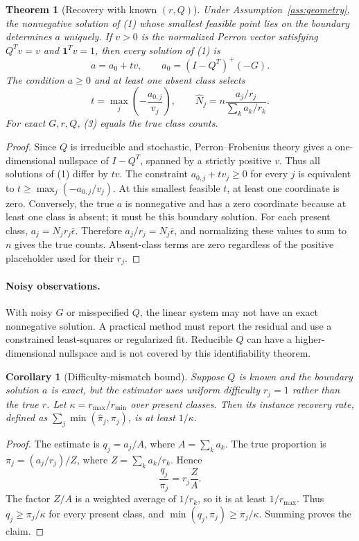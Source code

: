 \documentclass[11pt]{article}
\newtheorem{theorem}{Theorem}
\newtheorem{corollary}{Corollary}
\newcommand{\one}{\mathbf{1}}
\begin{document}
\begin{theorem}[Recovery with known $(r,Q)$]
\label{thm:general-recovery}
Under Assumption~\ref{ass:geometry}, the nonnegative solution of (1) whose
smallest feasible point lies on the boundary determines $a$ uniquely. If
$v>0$ is the normalized Perron vector satisfying $Q^Tv=v$ and
$\one^Tv=1$, then every solution of (1) is
\[
 a=a_0+tv,\qquad a_0=(I-Q^T)^+(-G).
\]
The condition $a\ge0$ and at least one absent class selects
\[
 t=\max_j\left(-\frac{a_{0,j}}{v_j}\right),
 \qquad
 \widehat N_j=n\frac{a_j/r_j}{\sum_k a_k/r_k}. \tag{3}
\]
For exact $G,r,Q$, (3) equals the true class counts.
\end{theorem}
\begin{proof}
Since $Q$ is irreducible and stochastic, Perron--Frobenius theory gives a
one-dimensional nullspace of $I-Q^T$, spanned by a strictly positive $v$.
Thus all solutions of (1) differ by $tv$. The constraint
$a_{0,j}+tv_j\ge0$ for every $j$ is equivalent to
$t\ge\max_j(-a_{0,j}/v_j)$. At this smallest feasible $t$, at least one
coordinate is zero. Conversely, the true $a$ is nonnegative and has a zero
coordinate because at least one class is absent; it must be this boundary
solution. For each present class, $a_j=N_jr_j\bar\epsilon$. Therefore
$a_j/r_j=N_j\bar\epsilon$, and normalizing these values to sum to $n$ gives
the true counts. Absent-class terms are zero regardless of the positive
placeholder used for their $r_j$.
\end{proof}
\paragraph{Noisy observations.} With noisy $G$ or misspecified $Q$, the
linear system may not have an exact nonnegative solution. A practical method
must report the residual and use a constrained least-squares or regularized
fit. Reducible $Q$ can have a higher-dimensional nullspace and is not covered
by this identifiability theorem.

\begin{corollary}[Difficulty-mismatch bound]
\label{cor:kappa}
Suppose $Q$ is known and the boundary solution $a$ is exact, but the estimator
uses uniform difficulty $r_j=1$ rather than the true $r$. Let
$\kappa=r_{\max}/r_{\min}$ over present classes. Then its instance recovery
rate, defined as $\sum_j\min(\widehat\pi_j,\pi_j)$, is at least
$1/\kappa$.
\end{corollary}
\begin{proof}
The estimate is $q_j=a_j/A$, where $A=\sum_k a_k$. The true proportion is
$\pi_j=(a_j/r_j)/Z$, where $Z=\sum_k a_k/r_k$. Hence
\[
 \frac{q_j}{\pi_j}=r_j\frac{Z}{A}.
\]
The factor $Z/A$ is a weighted average of $1/r_k$, so it is at least
$1/r_{\max}$. Thus $q_j\ge\pi_j/\kappa$ for every present class, and
$\min(q_j,\pi_j)\ge\pi_j/\kappa$. Summing proves the claim.
\end{proof}
\end{document}
